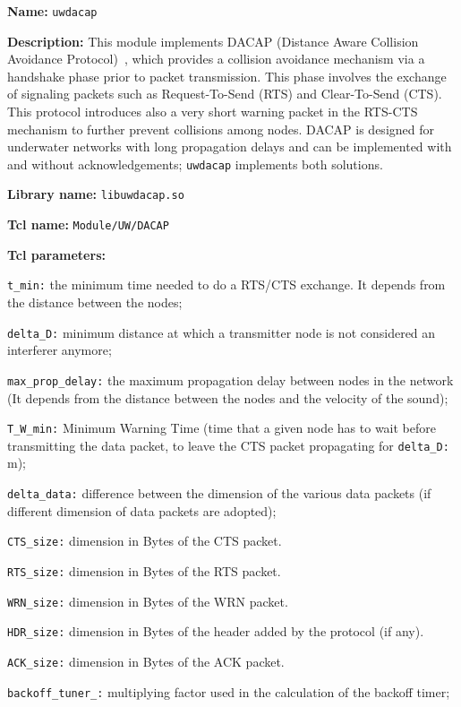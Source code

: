 \begin{description}
   \item {\bf Name:} {\tt uwdacap} 
   \item {\bf Description:}  This module implements DACAP (Distance Aware Collision Avoidance Protocol)~\cite{Peleato07}, which provides a collision avoidance mechanism via a handshake phase prior to packet transmission. This phase involves the exchange of signaling packets such as Request-To-Send (RTS) and Clear-To-Send (CTS). This protocol introduces also a very short warning packet in the RTS-CTS mechanism to further prevent collisions among nodes. DACAP is designed for underwater networks with long propagation delays and can be implemented with and without acknowledgements; {\tt uwdacap} implements both solutions.
   \item {\bf Library name:} {\tt libuwdacap.so}
   \item {\bf Tcl name:} {\tt Module/UW/DACAP}
   \item {\bf Tcl parameters:} 
   \begin{description}
	\item {\tt t\_min:} the minimum time needed to do a RTS/CTS exchange. It depends from the distance between the nodes;
	\item {\tt delta\_D:} minimum distance at which a transmitter node is not considered an interferer anymore;
	\item {\tt max\_prop\_delay:} the maximum propagation delay between nodes in the network (It depends from the distance between the nodes and the velocity of the sound);
	\item {\tt T\_W\_min:} Minimum Warning Time (time that a given node has to wait before transmitting the data packet, to leave the CTS packet propagating for {\tt delta\_D:} m);
	\item {\tt delta\_data:} difference between the dimension of the various data packets (if different dimension of data packets are adopted);
	\item {\tt CTS\_size:} dimension in Bytes of the CTS packet.
	\item {\tt RTS\_size:} dimension in Bytes of the RTS packet.
	\item {\tt WRN\_size:} dimension in Bytes of the WRN packet.
	\item {\tt HDR\_size:} dimension in Bytes of the header added by the protocol (if any).
	\item {\tt ACK\_size:} dimension in Bytes of the ACK packet.
   \item {\tt backoff\_tuner\_:} multiplying factor used in the calculation of the backoff timer;

\end{description}
\end{description}
